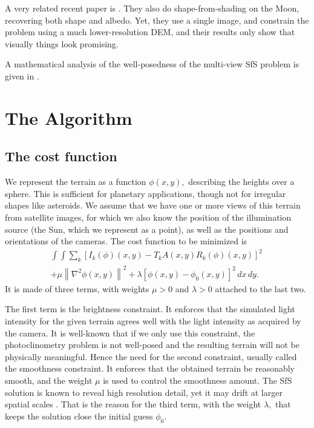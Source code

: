 \documentclass[12pt,oneside]{article}
\begin{document}
A very related recent paper is \cite{wu2016shape}. They also do
shape-from-shading on the Moon, recovering both shape and albedo. Yet,
they use a single image, and constrain the problem using a much
lower-resolution DEM, and their results only show that visually things
look promising.

A mathematical analysis of the well-posedness of the multi-view SfS
problem is given in \cite{jin20083}.

\section{The Algorithm}

\subsection{The cost function}

We represent the terrain as a function $\phi(x, y),$ describing the heights
over a sphere. This is sufficient for planetary applications,
though not for irregular shapes like asteroids. We assume that we have
one or more views of this terrain from satellite images, for which we
also know the position of the illumination source (the Sun, which we
represent as a point), as well as the positions and orientations of the
cameras. The cost function to be minimized is
\begin{multline}\label{cost}
\int\!\! \int \! \sum_k \left[ I_k(\phi)(x, y) - T_k A(x, y)
 R_k(\phi)(x, y) \right]^2\,  \\
+ \mu \left\|\nabla^2 \phi(x, y) \right\|^2  
+ \lambda  \left[ \phi(x, y) - \phi_0(x, y) \right]^2
\, dx\, dy.
\end{multline}
It is made of three terms, with weights $\mu > 0$ and $\lambda > 0$
attached to the last two.

The first term is the brightness constraint. It enforces that the simulated light intensity
for the given terrain agrees well with the light intensity as acquired
by the camera. It is well-known that if we only use this constraint, the
photoclinometry problem is not well-posed \citet{horn1990height} and the
resulting terrain will not be physically meaningful. Hence the need for
the second constraint, usually called the smoothness constraint. It
enforces that the obtained terrain
be reasonably smooth, and the weight $\mu$ is used to control the
smoothness amount. The SfS solution is known to reveal high resolution
detail, yet it may drift at larger spatial scales \cite{grumpe2014construction}.
That is the reason for the third term, with the weight $\lambda,$ 
that keeps the solution close the initial guess $\phi_0.$ 
\end{document}
